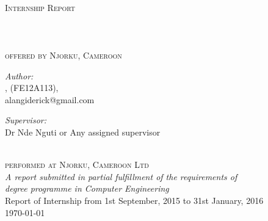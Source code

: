 \documentclass[
11pt, %
english, %
singlespacing, %
headsepline, %
]{InternshipReport} %
\author{Alangi \textsc{Derick}} %
\begin{document}
\frontmatter %

\pagestyle{plain} %


\begin{titlepage}
\begin{center}

\textsc{\LARGE \univname}\\[1.5cm] %
\textsc{\Large Internship Report}\\[0.5cm] %

\HRule \\[0.4cm] %
{\huge \bfseries \ttitle}\\[0.4cm] %
\HRule \\[1cm] %

\textsc{\Large offered by \LARGE Njorku, Cameroon}\\[1.2cm] %
 

\begin{minipage}{0.4\textwidth}
\begin{flushleft} \large
\emph{Author:}\\
{\authorname, (FE12A113), \\ alangiderick@gmail.com} %
\end{flushleft}
\end{minipage}
\begin{minipage}{0.4\textwidth}
\begin{flushright} \large
\emph{Supervisor:} \\
{Dr Nde Nguti or Any assigned supervisor} %
\end{flushright}
\end{minipage}\\[1.8cm]

\textsc{\Large performed at \LARGE Njorku, Cameroon Ltd}\\[2.0cm] %
 
\large \textit{A report submitted in partial fulfillment of the requirements of \\ \degreename degree programme in Computer Engineering} \\[1.2cm] %

\large{Report of Internship from 1st September, 2015 to 31st January, 2016}\\[2cm]
 
{\large \today}\\[4cm] %
 
\vfill
\end{center}
\end{titlepage}
\end{document}
